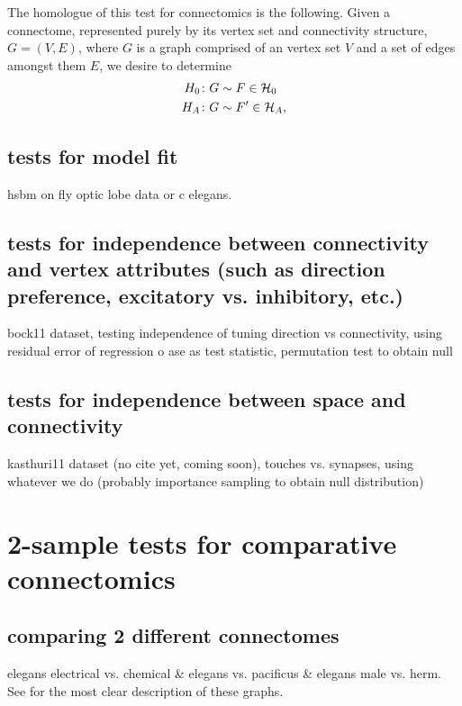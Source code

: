 \documentclass[final,leqno]{article}
\begin{document}
The homologue of this test for connectomics is the following.  Given a connectome, represented purely by its vertex set and connectivity structure, $G=(V,E)$, where $G$ is a graph comprised of an vertex set $V$ and a set of edges amongst them $E$, we desire to determine
\begin{align}
H_0 {\colon} & G \sim F \in \mathcal{H}_0 \\
H_A {\colon} & G \sim F' \in \mathcal{H}_A,
\end{align}


\subsection{tests for model fit}

hsbm on fly optic lobe data \cite{Takemura2013} or c elegans.


\subsection{tests for independence between connectivity and vertex attributes (such as direction preference, excitatory vs. inhibitory, etc.)}

bock11 \cite{Bock2011} dataset, testing independence of tuning direction vs connectivity, using residual error of regression o ase as test statistic, permutation test to obtain null

\subsection{tests for independence between space and connectivity}

kasthuri11 dataset (no cite yet, coming soon), touches vs. synapses, using whatever we do (probably importance sampling to obtain null distribution)



\section{2-sample tests for comparative connectomics}

\subsection{comparing 2 different connectomes}

elegans electrical vs. chemical \& elegans vs. pacificus \& elegans male vs. herm.  See \cite{Varshney2011} for the most clear description of these graphs.
\end{document}
